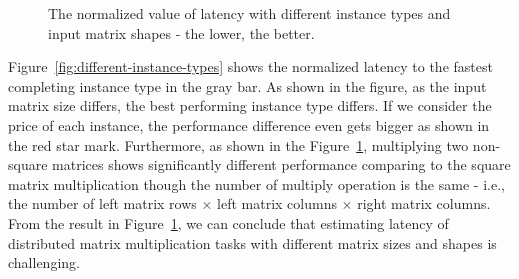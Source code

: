 \documentclass[10pt, conference, compsocconf]{IEEEtran}
\begin{document}
\begin{figure}[t]
  \centering
  \hfil\hfil\hfil\hfil\hfil\hfil\hfil\hfil\hfil\hfil{}
  \caption{\label{fig:instance-blocks-sizes-compare}The normalized value of latency with different instance types and input matrix shapes - the lower, the better.}
\end{figure}

Figure~\ref{fig:different-instance-types} shows the normalized latency to the fastest completing instance type in the gray bar. As shown in the figure, as the input matrix size differs, the best performing instance type differs. If we consider the price of each instance, the performance difference even gets bigger as shown in the red star mark. Furthermore, as shown in the Figure~\ref{fig:instance-blocks-sizes-compare}, multiplying two non-square matrices shows significantly different performance comparing to the square matrix multiplication though the number of multiply operation is the same - i.e., the number of left matrix rows $\times$ left matrix columns $\times$ right matrix columns. From the result in Figure~\ref{fig:instance-blocks-sizes-compare}, we can conclude that estimating latency of distributed matrix multiplication tasks with different matrix sizes and shapes is challenging.
\end{document}
